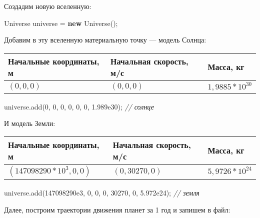 \documentclass[
  12pt,
  a4paper,
]{article}
\newenvironment{Shaded}{}{}
\newcommand{\CommentTok}[1]{\textcolor[rgb]{0.38,0.63,0.69}{\textit{#1}}}
\newcommand{\DecValTok}[1]{\textcolor[rgb]{0.25,0.63,0.44}{#1}}
\newcommand{\FloatTok}[1]{\textcolor[rgb]{0.25,0.63,0.44}{#1}}
\newcommand{\FunctionTok}[1]{\textcolor[rgb]{0.02,0.16,0.49}{#1}}
\newcommand{\KeywordTok}[1]{\textcolor[rgb]{0.00,0.44,0.13}{\textbf{#1}}}
\newcommand{\NormalTok}[1]{#1}
\newcommand{\OperatorTok}[1]{\textcolor[rgb]{0.40,0.40,0.40}{#1}}
\begin{document}
Создадим новую вселенную:

\begin{Shaded}
\begin{Highlighting}[]
\NormalTok{Universe universe }\OperatorTok{=} \KeywordTok{new} \FunctionTok{Universe}\OperatorTok{();}
\end{Highlighting}
\end{Shaded}

Добавим в эту вселенную материальную точку --- модель Солнца:

\begin{longtable}[]{@{}lll@{}}
\toprule
Начальные координаты, м & Начальная скорость, м/с & Масса, кг \\
\midrule
\endhead
\((0, 0, 0)\) & \((0, 0, 0)\) & \(1,9885*10^{30}\) \\
\bottomrule
\end{longtable}

\begin{Shaded}
\begin{Highlighting}[]
\NormalTok{universe}\OperatorTok{.}\FunctionTok{add}\OperatorTok{(}\DecValTok{0}\OperatorTok{,} \DecValTok{0}\OperatorTok{,} \DecValTok{0}\OperatorTok{,} \DecValTok{0}\OperatorTok{,} \DecValTok{0}\OperatorTok{,} \DecValTok{0}\OperatorTok{,} \FloatTok{1.989e30}\OperatorTok{);} \CommentTok{// солнце}
\end{Highlighting}
\end{Shaded}

И модель Земли:

\begin{longtable}[]{@{}lll@{}}
\toprule
Начальные координаты, м & Начальная скорость, м/с & Масса, кг \\
\midrule
\endhead
\((147098290*10^3, 0, 0)\) & \((0, 30270, 0)\) & \(5,9726*10^{24}\) \\
\bottomrule
\end{longtable}

\begin{Shaded}
\begin{Highlighting}[]
\NormalTok{universe}\OperatorTok{.}\FunctionTok{add}\OperatorTok{(}\FloatTok{147098290e3}\OperatorTok{,} \DecValTok{0}\OperatorTok{,} \DecValTok{0}\OperatorTok{,} \DecValTok{0}\OperatorTok{,} \DecValTok{30270}\OperatorTok{,} \DecValTok{0}\OperatorTok{,} \FloatTok{5.972e24}\OperatorTok{);} \CommentTok{// земля}
\end{Highlighting}
\end{Shaded}

Далее, построим траектории движения планет за 1 год и запишем в файл:
\end{document}
